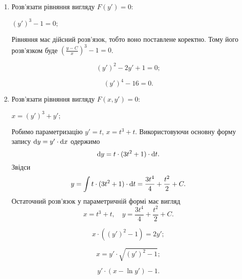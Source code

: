 \begin{enumerate}

\item Розв’язати рівняння вигляду $F(y') = 0$:
\begin{example}
	$(y')^3 - 1 = 0$;
\end{example}
\begin{solution}
	Рівняння має дійсний розв’язок, тобто воно поставлене коректно. Тому його розв’язком буде $\left(\frac{y - C}{x}\right)^3 - 1 = 0$.	
\end{solution}
\begin{multicols}{2}
\begin{problem}
	\[(y')^2 - 2 y' + 1 = 0;\]
\end{problem}
\begin{problem}
	\[ (y')^4 - 16 = 0. \]
\end{problem}
\end{multicols}

\item Розв’язати рівняння вигляду $F(x, y') = 0$:
\begin{example}
	$x = (y')^3 + y'$;
\end{example}
\begin{solution}
	Робимо параметризацію $y' = t$, $x = t^3 + t$. Використовуючи основну форму запису $\mathop{}\!\mathrm{d} y = y' \cdot \mathop{}\!\mathrm{d} x$ одержимо \[ \mathop{}\!\mathrm{d} y = t \cdot (3t^2 + 1) \cdot \mathop{}\!\mathrm{d} t.\]
	Звідси  \[ y = \int t \cdot (3t^2 + 1) \cdot \mathop{}\!\mathrm{d} t = \frac{3t^4}{4} + \frac{t^2}{2} + C.\]
	Остаточний розв’язок у параметричній формі має вигляд\[ x = t^3 + t, \quad y = \frac{3t^4}{4} + \frac{t^2}{2} + C.\]
\end{solution}
\begin{multicols}{2}
\begin{problem}
	\[ x \cdot ((y')^2 - 1) = 2y'; \]
\end{problem}
\begin{problem}
	\[ x = y' \cdot \sqrt{(y')^2 - 1}; \]
\end{problem}
\begin{problem}
 	\[ y' \cdot (x - \ln y') - 1. \]
\end{problem}
\end{multicols}


\end{enumerate}
